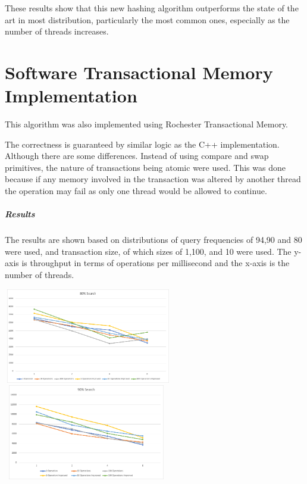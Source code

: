 \documentclass{article}
\begin{document}
These results show that this new hashing algorithm outperforms the state of the art in most distribution, particularly
the most common ones, especially as the number of threads increases.

\section[Software Transactional Memory Implementation]{Software Transactional Memory Implementation}
This algorithm was also implemented using Rochester Transactional Memory.

The correctness is guaranteed by similar logic as the C++ implementation. Although there are some differences. Instead
of using compare and swap primitives, the nature of transactions being atomic were used. This was done because if any
memory involved in the transaction was altered by another thread the operation may fail as only one thread would be
allowed to continue. 

\subparagraph{Results}
The results are shown based on distributions of query frequencies of 94,90 and 80 were used, and transaction size, of
which sizes of 1,100, and 10 were used. The y-axis is throughput in terms of operations per millisecond and the x-axis
is the number of threads.

 \includegraphics[width=2.9165in,height=1.6362in]{Report-img015.png} 
\includegraphics[width=2.8547in,height=1.6453in]{Report-img016.png} 
\end{document}
